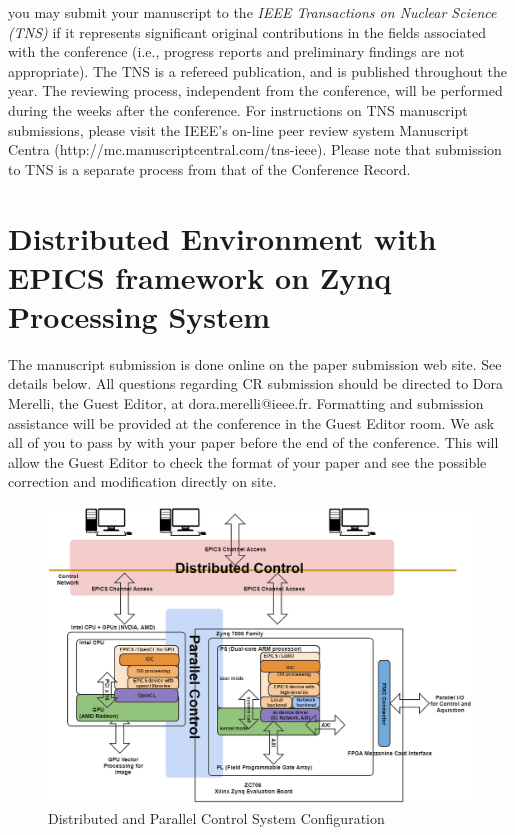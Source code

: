 \documentclass[journal]{IEEEtran}
\begin{document}

you may submit your manuscript to the \emph{IEEE Transactions on Nuclear Science (TNS)} if it represents significant original contributions in the fields associated with the conference (i.e., progress reports and preliminary findings are not appropriate).  The TNS is a refereed publication, and is published throughout the year. The reviewing process, independent from the conference, will be performed during the weeks after the conference. For instructions on TNS  manuscript submissions, please visit the IEEE's on-line peer review system Manuscript Centra   (http://mc.manuscriptcentral.com/tns-ieee). Please note that submission to TNS  is a separate process from that of the Conference Record.

\section{Distributed Environment with EPICS framework on Zynq Processing System}

The manuscript submission is done online on the paper submission web site.  See details below. All questions regarding CR submission should be directed to Dora Merelli, the Guest Editor, at dora.merelli@ieee.fr. Formatting and submission assistance will be provided at the conference in the Guest Editor room. We ask all of you to pass by with your paper before the end of the conference. This will allow the Guest Editor to check the format of your paper and see the possible correction and modification directly on site.



\begin{figure}[!tbh]
	\centering
	\includegraphics*[width=\textwidth,height=0.7\textwidth]{img01.png}
	\caption{Distributed and Parallel Control System Configuration}
	\label{control_system}
\end{figure}
\end{document}
